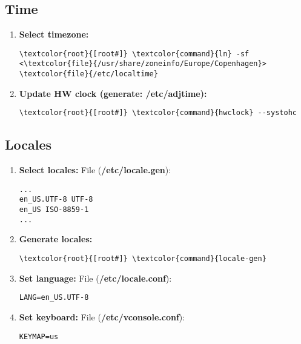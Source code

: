 \documentclass[10pt, a4paper, onecolumn, openany]{book} %
\begin{document}
\subsection{Time}
\begin{enumerate}
    \item \textbf{Select timezone:}
\begin{Verbatim}[commandchars=\\\{\}]
\textcolor{root}{[root#]} \textcolor{command}{ln} -sf <\textcolor{file}{/usr/share/zoneinfo/Europe/Copenhagen}> 
\textcolor{file}{/etc/localtime}
\end{Verbatim}
        \item \textbf{Update HW clock (generate: /etc/adjtime):}
\begin{Verbatim}[commandchars=\\\{\}]
\textcolor{root}{[root#]} \textcolor{command}{hwclock} --systohc
\end{Verbatim}
\end{enumerate}
\subsection{Locales}
    \begin{enumerate}
        \item \textbf{Select locales:}
\newline File (\textbf{\textcolor{file}{/etc/locale.gen}}):
\begin{Verbatim}[commandchars=\\\{\}]
...
en_US.UTF-8 UTF-8
en_US ISO-8859-1
...
\end{Verbatim}
        \item \textbf{Generate locales:}
\begin{Verbatim}[commandchars=\\\{\}]
\textcolor{root}{[root#]} \textcolor{command}{locale-gen}
\end{Verbatim}      
        \item \textbf{Set language:}
\newline File (\textbf{\textcolor{file}{/etc/locale.conf}}):
\begin{Verbatim}[commandchars=\\\{\}]
LANG=en_US.UTF-8
\end{Verbatim}
        \item \textbf{Set keyboard:}
\newline File (\textbf{\textcolor{file}{/etc/vconsole.conf}}):
\begin{Verbatim}[commandchars=\\\{\}]
KEYMAP=us
\end{Verbatim}
    \end{enumerate}
\end{document}
